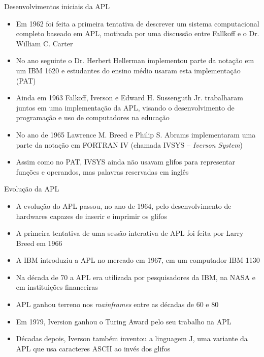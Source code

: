 \begin{frame}[fragile]{Desenvolvimentos iniciais da APL}

    \begin{itemize}
        \item Em 1962 foi feita a primeira tentativa de descrever um sistema computacional completo baseado em APL, motivada por uma discussão entre Fallkoff e o Dr. William C. Carter

        \item No ano seguinte o Dr. Herbert Hellerman implementou parte da notação em um IBM 1620 e estudantes do ensino médio usaram esta implementação (PAT)

        \item Ainda em 1963 Falkoff, Iverson e Edward H. Sussenguth Jr. trabalharam juntos em uma implementação da APL, visando o desenvolvimento de programação e uso de computadores na educação

        \item No ano de 1965 Lawrence M. Breed e Philip S. Abrams implementaram uma parte da notação em FORTRAN IV (chamada IVSYS -- \textit{Iverson System})

        \item Assim como no PAT, IVSYS ainda não usavam glifos para representar funções e operandos, mas palavras reservadas em inglês
    \end{itemize}

\end{frame}

\begin{frame}[fragile]{Evolução da APL}

    \begin{itemize}
        \item A evolução do APL passou, no ano de 1964, pelo desenvolvimento de hardwares capazes de inserir e imprimir os glifos

        \item A primeira tentativa de uma sessão interativa de APL foi feita por Larry Breed em 1966

        \item A IBM introduziu a APL no mercado em 1967, em um computador IBM 1130

        \item Na década de 70 a APL era utilizada por pesquisadores da IBM, na NASA e em instituições financeiras

        \item APL ganhou terreno nos \textit{mainframes} entre as décadas de 60 e 80

        \item Em 1979, Iversion ganhou o Turing Award pelo seu trabalho na APL

        \item Décadas depois, Iverson também inventou a linguagem J, uma variante da APL que usa caracteres ASCII ao invés dos glifos
    \end{itemize}

\end{frame}

